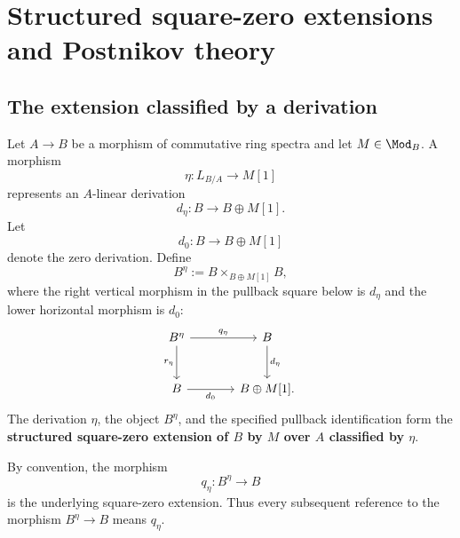 \section{Structured square-zero extensions and Postnikov theory}
\label{sec:structured-square-zero-postnikov}

\subsection{The extension classified by a derivation}

\begin{definition}
\label{def:structured-square-zero-extension}
Let \(A\to B\) be a morphism of commutative ring spectra and let
\(M\in\Mod_B\). A morphism
\[
    \eta
    \colon
    L_{B/A}
    \longrightarrow
    M[1]
\]
represents an \(A\)-linear derivation
\[
    d_\eta
    \colon
    B
    \longrightarrow
    B\oplus M[1].
\]
Let
\[
    d_0
    \colon
    B
    \longrightarrow
    B\oplus M[1]
\]
denote the zero derivation. Define
\[
    B^\eta
    :=
    B
    \times_{B\oplus M[1]}
    B,
\]
where the right vertical morphism in the pullback square below is
\(d_\eta\) and the lower horizontal morphism is \(d_0\):
\[
\begin{tikzcd}[column sep=large, row sep=large]
    B^\eta
        \arrow[r, "q_\eta"]
        \arrow[d, "r_\eta"']
    &
    B
        \arrow[d, "d_\eta"]
    \\
    B
        \arrow[r, "d_0"']
    &
    B\oplus M[1].
\end{tikzcd}
\]
The derivation \(\eta\), the object \(B^\eta\), and the specified
pullback identification form the
\textbf{structured square-zero extension of \(B\) by \(M\) over \(A\)
classified by \(\eta\)}.

By convention, the morphism
\[
    q_\eta
    \colon
    B^\eta
    \longrightarrow
    B
\]
is the underlying square-zero extension. Thus every subsequent reference
to the morphism \(B^\eta\to B\) means \(q_\eta\).
\end{definition}

